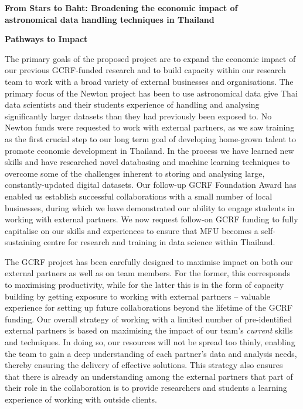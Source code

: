 \documentclass[11pt]{article}
\begin{document}
  \setcounter{figure}{0}
  \noindent
  {\LARGE \bf From Stars to Baht: Broadening the economic impact of \\
  astronomical data handling techniques in Thailand}
  
  \vspace{3mm}
  \noindent
  {\LARGE \bf Pathways to Impact}
  
  \vspace{3mm}
  \noindent
  The primary goals of the proposed project are to expand the economic impact of our previous GCRF-funded research and to build capacity within our research team to work with a broad variety of external businesses and organisations. The primary focus of the Newton project has been to use astronomical data give Thai data scientists and their students experience of handling and analysing significantly larger datasets than they had previously been exposed to. No Newton funds were requested to work with external partners, as we saw training as the first crucial step to our long term goal of developing home-grown talent to promote economic development in Thailand. In the process we have learned new skills and have researched novel databasing and machine learning techniques to overcome some of the challenges inherent to storing and analysing large, constantly-updated digital datasets. Our follow-up GCRF Foundation Award has enabled us establish successful collaborations with a small number of local businesses, during which we have demonstrated our ability to engage students in working with external partners. We now request follow-on GCRF funding to fully capitalise on our skills and experiences to ensure that MFU becomes a self-sustaining centre for research and training in data science within Thailand.  
  
  \vspace{2mm}
  \noindent
  The GCRF project has been carefully designed to maximise impact on both our external partners as well as on team members. For the former, this corresponds to maximising productivity, while for the latter this is in the form of capacity building by getting exposure to working with external partners -- valuable experience for setting up future collaborations beyond the lifetime of the GCRF funding. Our overall strategy of working with a limited number of pre-identified external partners is based on maximising the impact of our team's {\it current} skills and techniques. In doing so, our resources will not be spread too thinly, enabling the team to gain a deep understanding of each partner's data and analysis needs, thereby ensuring the delivery of effective solutions. This strategy also ensures that there is already an understanding among the external partners that part of their role in the collaboration is to provide researchers and students a learning experience of working with outside clients.
  
\end{document}
